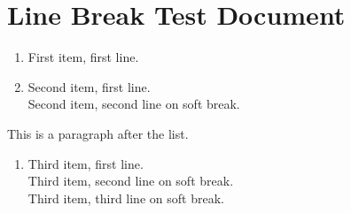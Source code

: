 \hypertarget{line-break-test-document}{%
\section{Line Break Test Document}\label{line-break-test-document}}

\begin{enumerate}
\def\labelenumi{\arabic{enumi}.}
\item
  First item, first line.
\item
  Second item, first line.\\
  Second item, second line on soft break.
\end{enumerate}

This is a paragraph after the list.

\begin{enumerate}
\def\labelenumi{\arabic{enumi}.}
\setcounter{enumi}{2}
\item
  Third item, first line.\\
  Third item, second line on soft break.\\
  Third item, third line on soft break.
\end{enumerate}
